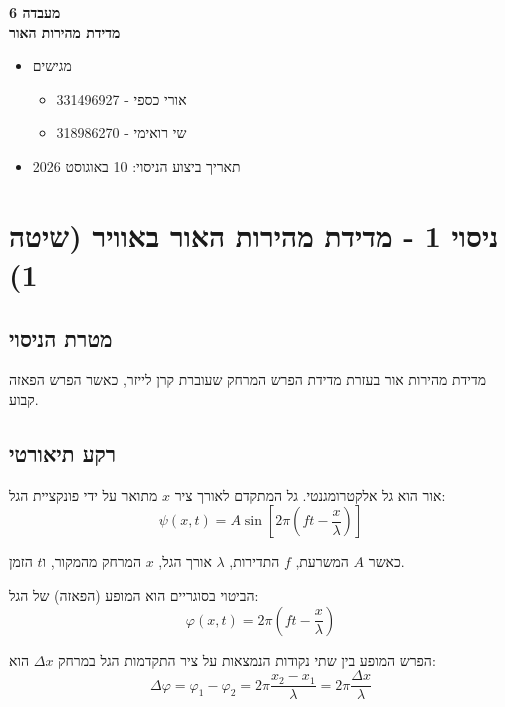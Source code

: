 \documentclass[14pt]{extarticle}
\begin{document}
\begin{center}
    {\LARGE \textbf{מעבדה 6}}\\
    {\textbf{מדידת מהירות האור}}
\end{center}

\begin{itemize}
    \item מגישים
    \begin{itemize}
        \item אורי כספי - 331496927 
        \item שי רואימי - 318986270
    \end{itemize}
    \item תאריך ביצוע הניסוי: 10 באוגוסט 2026
\end{itemize}

\newpage
\section*{ניסוי 1 - מדידת מהירות האור באוויר (שיטה 1)}

\subsection*{מטרת הניסוי}
מדידת מהירות אור בעזרת מדידת הפרש המרחק שעוברת קרן לייזר, כאשר הפרש הפאזה קבוע.

\subsection*{רקע תיאורטי}
אור הוא גל אלקטרומגנטי.
גל המתקדם לאורך ציר $x$ מתואר על ידי פונקציית הגל:
\begin{equation}
    \psi(x,t) = A \sin\left[ 2\pi \left( f t - \frac{x}{\lambda} \right) \right]
\end{equation}

כאשר $A$ המשרעת, $f$ התדירות, $\lambda$ אורך הגל, $x$ המרחק מהמקור, ו$t$ הזמן.

הביטוי בסוגריים הוא המופע (הפאזה) של הגל:
\begin{equation}
    \varphi(x,t) = 2\pi \left( f t - \frac{x}{\lambda} \right)
\end{equation}

הפרש המופע בין שתי נקודות הנמצאות על ציר התקדמות הגל במרחק $\Delta x$ הוא:
\begin{equation}
    \Delta \varphi = \varphi_1 - \varphi_2 = 2\pi \frac{x_2 - x_1}{\lambda} = 2\pi \frac{\Delta x}{\lambda}
\end{equation}
\end{document}
